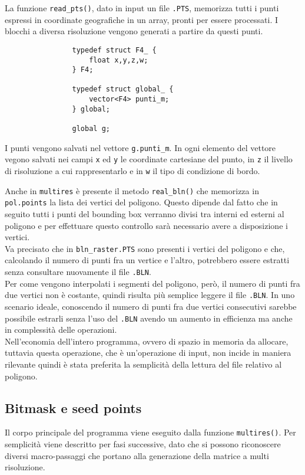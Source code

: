 			La funzione \texttt{read\_pts()}, dato in input un file \texttt{.PTS}, memorizza tutti i punti espressi in coordinate geografiche in un array, pronti per essere processati. I blocchi a diversa risoluzione vengono generati a partire da questi punti.
			\begin{verbatim}
				typedef struct F4_ {
				    float x,y,z,w;
				} F4;

				typedef struct global_ {
				    vector<F4> punti_m;
				} global;

				global g;
			\end{verbatim}
			I punti vengono salvati nel vettore \texttt{g.punti\_m}. In ogni elemento del vettore vegono salvati nei campi \texttt{x} ed \texttt{y} le coordinate cartesiane del punto, in \texttt{z} il livello di risoluzione a cui rappresentarlo e in \texttt{w} il tipo di condizione di bordo. 

			Anche in \texttt{multires} \`{e} presente il metodo \texttt{real\_bln()} che memorizza in \texttt{pol.points} la lista dei vertici del poligono. Questo dipende dal fatto che in seguito tutti i punti del bounding box verranno divisi tra interni ed esterni al poligono e per effettuare questo controllo sar\`{a} necessario avere a disposizione i vertici.\\
			Va precisato che in \texttt{bln\_raster.PTS} sono presenti i vertici del poligono e che, calcolando il numero di punti fra un vertice e l'altro, potrebbero essere estratti senza consultare nuovamente il file \texttt{.BLN}.\\
			Per come vengono interpolati i segmenti del poligono, per\`{o}, il numero di punti fra due vertici non \`{e} costante, quindi risulta pi\`{u} semplice leggere il file \texttt{.BLN}.
			In uno scenario ideale, conoscendo il numero di punti fra due vertici consecutivi sarebbe possibile estrarli senza l'uso del \texttt{.BLN} avendo un aumento in efficienza ma anche in complessit\`{a} delle operazioni. \\
			Nell'economia dell'intero programma, ovvero di spazio in memoria da allocare, tuttavia questa operazione, che \`{e} un'operazione di input, non incide in maniera rilevante quindi \`{e} stata preferita la semplicit\`{a} della lettura del file relativo al poligono. 

		\subsection{Bitmask e seed points}
			Il corpo principale del programma viene eseguito dalla funzione \texttt{multires()}. Per semplicit\`{a} viene descritto per fasi successive, dato che si possono riconoscere diversi macro-passaggi che portano alla generazione della matrice a multi risoluzione.

